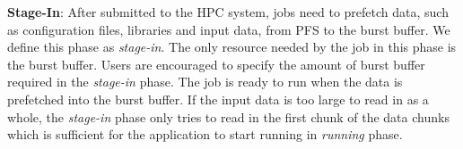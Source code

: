 



 
\textbf{Stage-In}: After submitted to the HPC system,
         jobs need to prefetch data, such as configuration files, libraries and input data,
         from PFS to the burst buffer. We define this phase as \textit{stage-in}.
         The only resource needed by the job in this phase is the burst buffer.
         Users are encouraged to specify the amount of burst buffer required in the \textit{stage-in} phase.
         The job is ready to run when the data is prefetched into the burst buffer.
         If the input data is too large to read in as a whole, the \textit{stage-in} phase
         only tries to read in the first chunk of the data chunks which is sufficient for
         the application to start running in \textit{running} phase.
 
